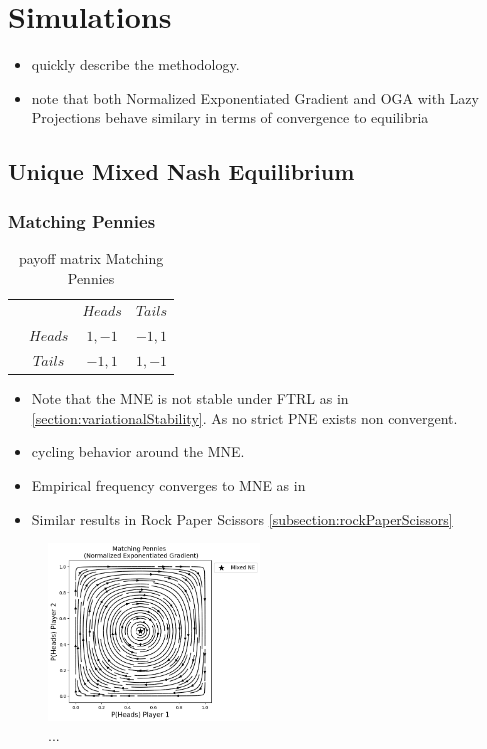 
\chapter{Simulations}\label{chapter:simulations}

\begin{itemize}
    \item quickly describe the methodology.
    \item note that both Normalized Exponentiated Gradient and OGA with Lazy Projections behave similary in terms of convergence to equilibria
\end{itemize}

\section{Unique Mixed Nash Equilibrium}\label{section:uniqueMixedNashEquilibrium}

\subsection{Matching Pennies}\label{subsection:machtingPennies}

\begin{table}\centering
\setlength{\extrarowheight}{2pt}
\begin{tabular}{cc|c|c|}
  & \multicolumn{1}{c}{} & \multicolumn{1}{c}{$Heads$}  & \multicolumn{1}{c}{$Tails$} \\\cline{3-4}
  & $Heads$ & $1,-1$ & $-1,1$ \\\cline{3-4}
  & $Tails$ & $-1,1$ & $1,-1$ \\\cline{3-4}
\end{tabular}\caption{\label{tab:payoffMachtingPennies}payoff matrix Matching Pennies}
\end{table}

\begin{itemize}
    \item Note that the MNE is not stable under FTRL as in \ref{section:variationalStability}. As no strict PNE exists non convergent.
    \item cycling behavior around the MNE.
    \item Empirical frequency converges to MNE as in \cite{jafari}
    \item Similar results in Rock Paper Scissors \ref{subsection:rockPaperScissors}
\end{itemize}

\begin{figure}
    \centering
    \includegraphics[width=0.5\textwidth]{logos/Pennies1.png}
    \caption{...}
    \label{Pennies1}
\end{figure}

